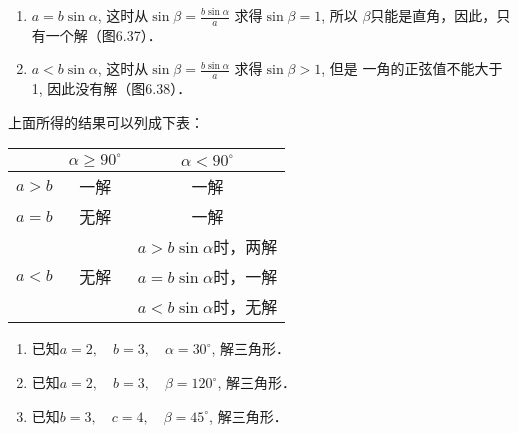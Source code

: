 \begin{enumerate}
\begin{enumerate}
  \item $a=b\sin\alpha$, 这时从$\sin\beta=\frac{b\sin\alpha}{a}$
    求得$\sin\beta=1$, 所以
    $\beta$只能是直角，因此，只有一个解（图6.37）．
\item $a<b\sin\alpha$, 这时从$\sin\beta=\frac{b\sin\alpha}{a}$
    求得$\sin\beta>1$, 但是
    一角的正弦值不能大于1, 因此没有解（图6.38）．
\end{enumerate}
\end{enumerate}

\begin{figure}[htp]\centering
    \begin{minipage}[t]{0.48\textwidth}
    \centering
{}
    \caption{}
    \end{minipage}
    \begin{minipage}[t]{0.48\textwidth}
    \centering
    \caption{}
    \end{minipage}
    \end{figure}

上面所得的结果可以列成下表：
\begin{center}
\begin{tabular}{c|c|c}
\hline
& $\alpha\ge 90^{\circ}$ &$\alpha<90^{\circ}$\\
\hline
$a>b$& 一解&一解\\ \hline
$a=b$&无解&一解\\
\hline
& & $a>b\sin\alpha$时，两解\\
$a<b$ &无解 & $a=b\sin\alpha$时，一解\\
& & $a<b\sin\alpha$时，无解\\
\hline
\end{tabular}
\end{center}



\begin{ex}
\begin{enumerate}
\item 已知$a=2,\quad b=3,\quad \alpha=30^{\circ}$, 解三角形．
\item 已知$a=2,\quad b=3,\quad \beta=120^{\circ}$, 解三角形．
\item 已知$b=3,\quad c=4,\quad \beta=45^{\circ}$, 解三角形．
\end{enumerate}   
\end{ex}

